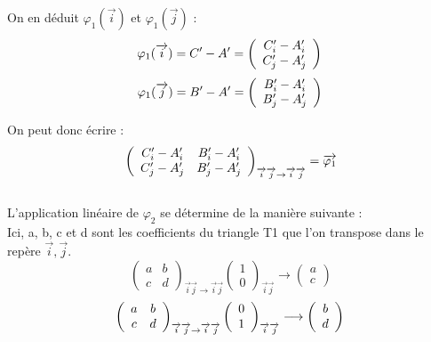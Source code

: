 \documentclass[a4paper, 12pt]{report}
\begin{document}
		On en déduit $\varphi _{1} (\overrightarrow{i})$ et $\varphi _{1} (\overrightarrow{j})$ :
		$$
		\varphi _{1} (\overrightarrow{i}) = C' - A' = \left(\begin{array}{c}
		C' _{i} - A' _{i} \\
		C' _{j} - A' _{j}
		\end{array}
		\right)
		\\
		$$
		$$
		\varphi _{1} (\overrightarrow{j}) = B' - A' = \left(\begin{array}{c}
		B' _{i} - A' _{i} \\
		B' _{j} - A' _{j}
		\end{array}
		\right)
		\\
		$$
		
		On peut donc écrire :
		$$
		\left(\begin{array}{cc}
		C' _{i} - A' _{i} & B' _{i} - A' _{i} \\
		C' _{j} - A' _{j} & B' _{j} - A' _{j} 
		\end{array}
		\right) _{\overrightarrow{i}\overrightarrow{j} \rightarrow \overrightarrow{i}\overrightarrow{j}} = {\cal \overrightarrow{\varphi _{1}}}
		$$
		\\
		
		L'application linéaire de $\varphi_{2}$ se détermine de la manière suivante : \\
		Ici, a, b, c et d sont les coefficients du triangle T1 que l'on transpose dans le repère $\overrightarrow{i},\overrightarrow{j}$.
		$$
		\left(\begin{array}{cc}
		a & b \\
		c & d 
		\end{array}
		\right) _{\overrightarrow{i}\overrightarrow{j} \rightarrow \overrightarrow{i}\overrightarrow{j}}
		\left(\begin{array}{c}
		1 \\
		0 
		\end{array}
		\right) _{\overrightarrow{i}\overrightarrow{j}} 
		\longrightarrow
		\left(\begin{array}{c}
		a\\
		c
		\end{array}
		\right)
		$$
		$$
		\left(\begin{array}{cc}
		a & b \\
		c & d 
		\end{array}
		\right) _{\overrightarrow{i}\overrightarrow{j} \rightarrow \overrightarrow{i}\overrightarrow{j}}
		\left(\begin{array}{c}
		0 \\
		1 
		\end{array}
		\right) _{\overrightarrow{i}\overrightarrow{j}} 
		\longrightarrow
		\left(\begin{array}{c}
		b\\
		d
		\end{array}
		\right)
		\\
		$$
		
\end{document}
